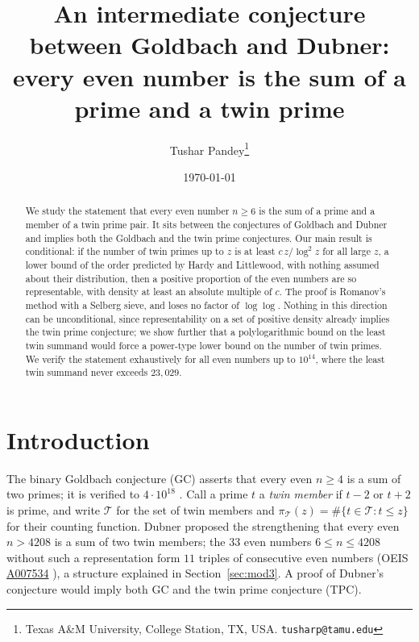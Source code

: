 \documentclass[10pt]{article}
\title{An intermediate conjecture between Goldbach and Dubner:\\
every even number is the sum of a prime and a twin prime}
\author{Tushar Pandey\thanks{Texas A\&M University, College Station, TX,
USA. \texttt{tusharp@tamu.edu}}}
\date{\today}
\theoremstyle{definition}
\theoremstyle{remark}
\newcommand{\T}{\mathcal{T}}
\begin{document}
\maketitle
{\let\thefootnote\relax{}}

\begin{abstract}
We study the statement that every even number $n \ge 6$ is the sum of a
prime and a member of a twin prime pair. It sits between the conjectures of
Goldbach and Dubner and implies both the Goldbach and the twin prime
conjectures. Our main result is conditional: if the number of twin primes up
to $z$ is at least $c\,z/\log^2 z$ for all large $z$, a lower bound of the
order predicted by Hardy and Littlewood, with nothing assumed about their
distribution, then a positive proportion of the even numbers are so
representable, with density at least an absolute multiple of $c$. The proof
is Romanov's method with a Selberg sieve, and loses no factor of
$\log\log$. Nothing in this direction can be unconditional, since
representability on a set of positive density already implies the twin prime
conjecture; we show further that a polylogarithmic bound on the least twin
summand would force a power-type lower bound on the number of twin primes.
We verify the statement exhaustively for all even numbers up to $10^{14}$,
where the least twin summand never exceeds $23{,}029$.
\end{abstract}

\section{Introduction}

The binary Goldbach conjecture (GC) asserts that every even $n \ge 4$ is a
sum of two primes; it is verified to $4 \cdot 10^{18}$
\cite{OeS}. Call a prime $t$ a \emph{twin member} if $t - 2$ or $t + 2$ is
prime, and write $\T$ for the set of twin members and
$\pi_\T(z) = \#\{t \in \T : t \le z\}$ for their counting function.
Dubner \cite{Dubner} proposed the strengthening that every even $n > 4208$ is
a sum of two twin members; the $33$ even numbers $6 \le n \le 4208$ without
such a representation form $11$ triples of consecutive even numbers
(OEIS \href{https://oeis.org/A007534}{A007534} \cite{OEIS}), a structure
explained in Section~\ref{sec:mod3}. A proof of Dubner's conjecture would
imply both GC and the twin prime conjecture (TPC).
\end{document}
